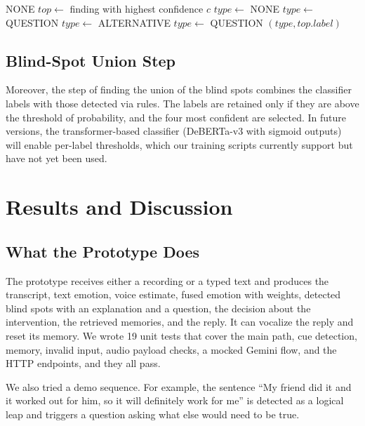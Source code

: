 \documentclass[conference]{IEEEtran}
\begin{document}
\begin{algorithm}[htbp]
\caption{$\textsc{Decide}(findings, emotion)$}
\label{alg:decide}
\begin{algorithmic}[1]
    \State \Return NONE
\EndIf
\State $top \leftarrow$ finding with highest confidence $c$
    \State $type \leftarrow$ NONE
    \State $type \leftarrow$ QUESTION
\Else
    \State $type \leftarrow$ ALTERNATIVE
\EndIf
{}
    \State $type \leftarrow$ QUESTION 
\EndIf
\State \Return $(type, top.label)$
\end{algorithmic}
\end{algorithm}

\subsection{Blind-Spot Union Step}
Moreover, the step of finding the union of the blind spots combines the classifier labels with those detected via rules. The labels are retained only if they are above the threshold of probability, and the four most confident are selected. In future versions, the transformer-based classifier (DeBERTa-v3 with sigmoid outputs) will enable per-label thresholds, which our training scripts currently support but have not yet been used.

\section{Results and Discussion}
\label{sec:results}

\subsection{What the Prototype Does}
The prototype receives either a recording or a typed text and produces the transcript, text emotion, voice estimate, fused emotion with weights, detected blind spots with an explanation and a question, the decision about the intervention, the retrieved memories, and the reply. It can vocalize the reply and reset its memory. We wrote 19 unit tests that cover the main path, cue detection, memory, invalid input, audio payload checks, a mocked Gemini flow, and the HTTP endpoints, and they all pass.

We also tried a demo sequence. For example, the sentence ``My friend did it and it worked out for him, so it will definitely work for me'' is detected as a logical leap and triggers a question asking what else would need to be true.
\end{document}
